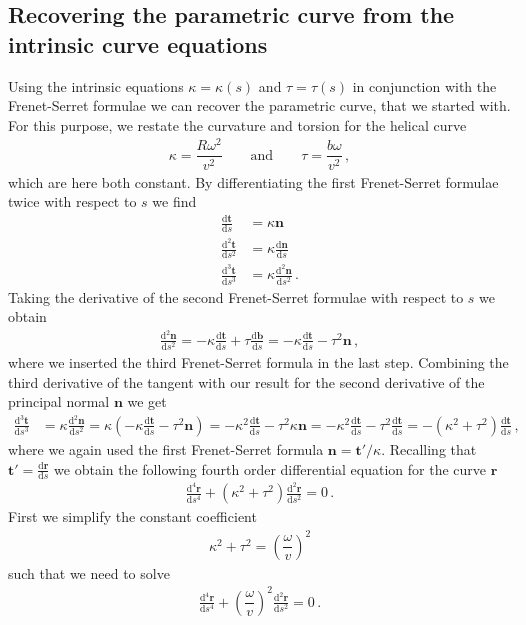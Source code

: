 \documentclass[11pt, DINA4, fleqn]{amsart}
\def\df{\mathrm{d}\xspace}
\newcommand{\dd}[2]{\frac{\df#1}{\df#2}}
\newcommand{\ddd}[2]{\frac{\df^2#1}{\df#2^2}}
\newcommand{\dddd}[2]{\frac{\df^3#1}{\df#2^3}}
\newcommand{\ddddd}[2]{\frac{\df^4#1}{\df#2^4}}
\def\vr{\boldsymbol{r}\xspace}
\def\vt{\boldsymbol{t}\xspace}
\def\vn{\boldsymbol{n}\xspace}
\def\vb{\boldsymbol{b}\xspace}
\begin{document}
\subsection{Recovering the parametric curve from the intrinsic curve equations}
Using the intrinsic equations $\kappa = \kappa(s)$ and $\tau = \tau(s)$ in conjunction with the Frenet-Serret formulae we can recover the parametric curve, that we started with. For this purpose, we restate the curvature and torsion for the helical curve
\begin{align}
\kappa = \dfrac{R\omega^2}{v^2} \qquad \text{and} \qquad \tau = \dfrac{b\omega}{v^2} \, ,
\end{align}
which are here both constant.
By differentiating the first Frenet-Serret formulae twice with respect to $s$ we find
\begin{align}
\dd{\vt}{s} &= \kappa \vn \\
\ddd{\vt}{s} &= \kappa \dd{\vn}{s} \\
\dddd{\vt}{s} &= \kappa \ddd{\vn}{s} \, .
\end{align}
Taking the derivative of the second Frenet-Serret formulae with respect to $s$ we obtain
\begin{align}
\ddd{\vn}{s} = -\kappa \dd{\vt}{s} + \tau\dd{\vb}{s} = -\kappa \dd{\vt}{s} - \tau^2 \vn \, ,
\end{align}
where we inserted the third Frenet-Serret formula in the last step.
Combining the third derivative of the tangent with our result for the second derivative of the principal normal $\vn$ we get
\begin{align}
\dddd{\vt}{s} &= \kappa \ddd{\vn}{s} = \kappa \left(
-\kappa \dd{\vt}{s} - \tau^2 \vn
\right) = -\kappa^2 \dd{\vt}{s} - \tau^2 \kappa \vn
= -\kappa^2 \dd{\vt}{s} - \tau^2 \dd{\vt}{s} = -(\kappa^2 + \tau^2) \dd{\vt}{s} \, ,
\end{align}
where we again used the first Frenet-Serret formula $\vn = \vt'/\kappa$.
Recalling that $\vt' = \dd{\vr}{s}$ we obtain the following fourth order differential equation for the curve $\vr$
\begin{align}
\ddddd{\vr}{s} + \left(\kappa^2 + \tau^2\right) \ddd{\vr}{s} = 0 \, .
\end{align}
First we simplify the constant coefficient
\begin{align}
\kappa ^2 + \tau^2 = \left(\dfrac{\omega}{v}\right)^2
\end{align}
such that we need to solve
\begin{align}
\ddddd{\vr}{s} +  \left(\dfrac{\omega}{v}\right)^2\ddd{\vr}{s} = 0 \, .
\end{align}
\end{document}
